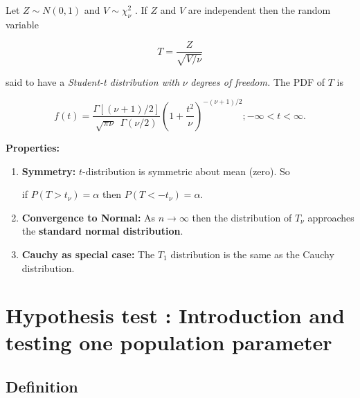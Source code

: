 \documentclass[
  11pt,
  letterpaper,
  DIV=11,
  numbers=noendperiod]{scrreprt}
\begin{document}
\begin{tcolorbox}[enhanced jigsaw, bottomrule=.15mm, toprule=.15mm, title=\textcolor{quarto-callout-note-color}{\faInfo}\hspace{0.5em}{\emph{t}-Distribution}, bottomtitle=1mm, colframe=quarto-callout-note-color-frame, coltitle=black, rightrule=.15mm, toptitle=1mm, colbacktitle=quarto-callout-note-color!10!white, titlerule=0mm, breakable, arc=.35mm, leftrule=.75mm, opacitybacktitle=0.6, opacityback=0, colback=white, left=2mm]

Let \(Z\sim N(0,1)\) and \(V\sim \chi^2 _\nu\) . If \(Z\) and \(V\) are
independent then the random variable

\[T=\frac{Z}{\sqrt {V/\nu}}\]

said to have a \emph{Student-t distribution with} \(\nu\) \emph{degrees
of freedom.} The PDF of \(T\) is

\[f(t)=\frac{\Gamma [(\nu+1)/2]}{\sqrt{ \pi\nu} \ \ \Gamma{(\nu/2)}}\left(1+\frac{t^2}{\nu}\right)^{-(\nu+1)/2} ; -\infty<t<\infty.\]

\textbf{Properties:}

\begin{enumerate}
\def\labelenumi{\arabic{enumi})}
\item
  \textbf{Symmetry:} \(t\)-distribution is symmetric about mean (zero).
  So

  if \(P(T>t_\nu)=\alpha\) then \(P(T<-t_\nu)=\alpha\).
\item
  \textbf{Convergence to Normal:} As \(n\rightarrow\infty\) then the
  distribution of \(T_\nu\) approaches the \textbf{standard normal
  distribution}.
\item
  \textbf{Cauchy as special case:} The \(T_1\) distribution is the same
  as the Cauchy distribution.
\end{enumerate}

\end{tcolorbox}

\section{Hypothesis test : Introduction and testing one population
parameter}\label{hypothesis-test-introduction-and-testing-one-population-parameter}

\subsection{\texorpdfstring{\textbf{Definition}}{Definition}}\label{definition-2}
\end{document}
